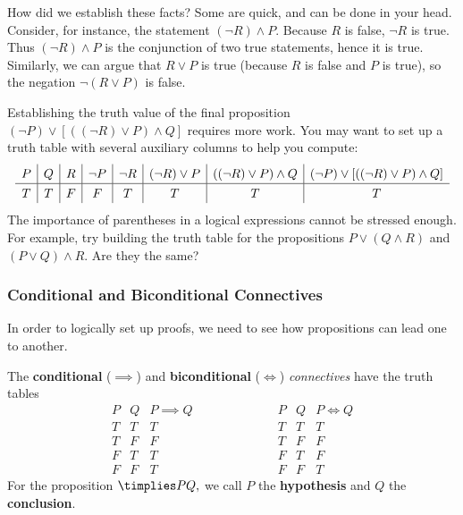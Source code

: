 \noindent How did we establish these facts? Some  are quick,  and can be done in your head. Consider, for instance, the statement  $(\neg R)\wedge P$. Because $R$ is false, $\neg R$ is true. Thus $(\neg R)\wedge P$ is the conjunction of two true statements, hence it is true. Similarly, we can argue that $R\vee P$ is true (because $R$ is false and $P$ is true), so the negation $\neg(R\vee P)$ is false.

\noindent  Establishing the truth value of the final proposition $(\neg P)\vee [((\neg R)\vee P) \wedge Q]$ requires more work. You may want to set up a truth table with several auxiliary columns to help you compute: 
\[\def\arraystretch{1.3}
\begin{array}{c|c|c|c|c|c|c|c}
P & Q & R & \neg P & \neg R & (\neg R) \vee P & ((\neg R)\vee P) \wedge Q &  (\neg P) \vee [ ((\neg R)\vee P) \wedge Q] \\\hline
 T & T & F & F            & T         & T                        & T                                               & T
 \end{array}\]
The importance of parentheses in a logical expressions cannot be stressed enough. For example, try building the truth table for the propositions $P\vee(Q\wedge R)$ and $(P\vee Q)\wedge R$. Are they the same?%


\subsubsection*{Conditional and Biconditional Connectives}

In order to logically set up proofs, we need to see how propositions can lead one to another.

\begin{defn}\label{defn:implies}
The \textbf{conditional} ($\implies$) and \textbf{biconditional} ($\iff$) \emph{connectives} have the truth tables
\[\begin{array}{cc|c}
P & Q & P\implies Q\\\hline
T & T & T\\
T & F & F\\
F & T & T\\
F & F & T
\end{array}\qquad\qquad\qquad
\begin{array}{cc|c}
P & Q & P\iff Q\\\hline
T & T & T\\
T & F & F\\
F & T & F\\
F & F & T
\end{array}\]
For the proposition $\timplies P{Q,}$ we call $P$ the \textbf{hypothesis} and $Q$ the \textbf{conclusion}.
\end{defn}

